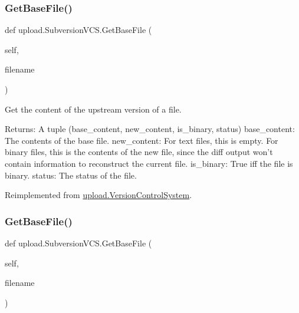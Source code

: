 \mbox{\label{classupload_1_1_subversion_v_c_s_a29dec4941de0824734d6842a2f33ffc3}} 
\subsubsection{\texorpdfstring{GetBaseFile()}{GetBaseFile()}\hspace{0.1cm}{\footnotesize\ttfamily [1/2]}}
{\footnotesize\ttfamily def upload.\+Subversion\+V\+C\+S.\+Get\+Base\+File (\begin{DoxyParamCaption}\item[{}]{self,  }\item[{}]{filename }\end{DoxyParamCaption})}

\begin{DoxyVerb}Get the content of the upstream version of a file.

Returns:
  A tuple (base_content, new_content, is_binary, status)
base_content: The contents of the base file.
new_content: For text files, this is empty.  For binary files, this is
  the contents of the new file, since the diff output won't contain
  information to reconstruct the current file.
is_binary: True iff the file is binary.
status: The status of the file.
\end{DoxyVerb}
 

Reimplemented from \mbox{\hyperlink{classupload_1_1_version_control_system_adfd9d4ecba422102233a2ba13e5bfaf5}{upload.\+Version\+Control\+System}}.

\mbox{\label{classupload_1_1_subversion_v_c_s_a29dec4941de0824734d6842a2f33ffc3}} 
\subsubsection{\texorpdfstring{GetBaseFile()}{GetBaseFile()}\hspace{0.1cm}{\footnotesize\ttfamily [2/2]}}
{\footnotesize\ttfamily def upload.\+Subversion\+V\+C\+S.\+Get\+Base\+File (\begin{DoxyParamCaption}\item[{}]{self,  }\item[{}]{filename }\end{DoxyParamCaption})}

